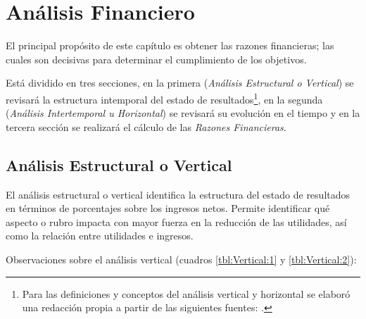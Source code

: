 \chapter{Análisis Financiero}
\label{cap:AnalsisFinanciero}


El principal propósito de este capítulo es obtener las razones financieras; las cuales son decisivas para determinar el cumplimiento de los objetivos.

Está dividido en tres secciones, en la primera (\emph{Análisis Estructural o Vertical}) se revisará la estructura intemporal del estado de resultados\footnote{Para las definiciones y conceptos del análisis vertical y horizontal se elaboró una redacción propia a partir de las siguientes fuentes: \citep{brock1987contabilidad, mejia2006diccionario, dobarganes2005contabilidad}.}, en la segunda (\emph{Análisis Intertemporal u Horizontal}) se revisará su evolución en el tiempo y en la tercera sección se realizará el cálculo de las \emph{Razones Financieras}.

\section{Análisis Estructural o Vertical}
\label{sec:AnalisisVertical}

El análisis estructural o vertical identifica la estructura del estado de resultados en términos de porcentajes sobre los ingresos netos. Permite identificar qué aspecto o rubro impacta con mayor fuerza en la reducción de las utilidades, así como la relación entre utilidades e ingresos.

Observaciones sobre el análisis vertical (cuadros \ref{tbl:Vertical:1} y \ref{tbl:Vertical:2}):

